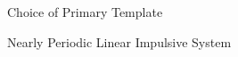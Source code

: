 \begin{frame}{Choice of Primary Template}


\end{frame}


\begin{frame}{Nearly Periodic Linear Impulsive System}
                     
\end{frame}










